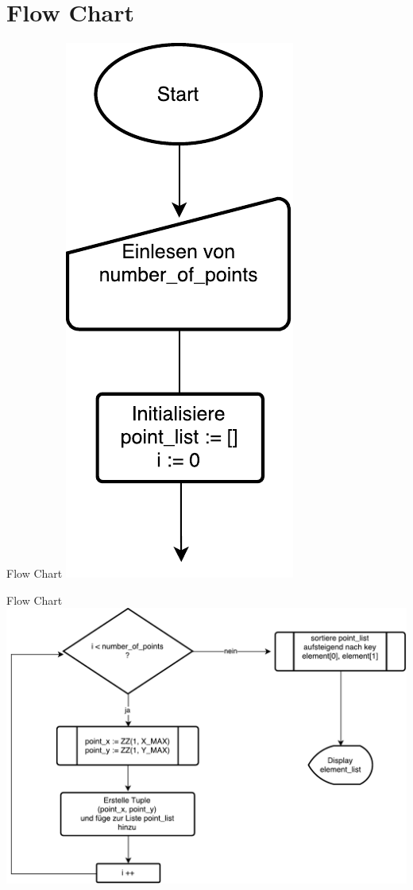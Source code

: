\section{Flow Chart}
\begin{frame}{Flow Chart}
	\centering
  	\includegraphics[scale=0.4]{BSP03_Flow_Chart_1.pdf}
\end{frame}
\begin{frame}{Flow Chart}
	\centering
  	\includegraphics[scale=0.4]{BSP03_Flow_Chart_2.pdf}
\end{frame}


